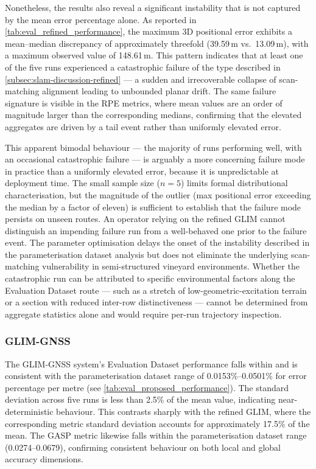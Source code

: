 Nonetheless, the results also reveal a significant instability that is not captured by the mean error percentage alone. As reported in \cref{tab:eval_refined_performance}, the maximum 3D positional error exhibits a mean--median discrepancy of approximately threefold (39.59\,m vs.\ 13.09\,m), with a maximum observed value of 148.61\,m. This pattern indicates that at least one of the five runs experienced a catastrophic failure of the type described in \cref{subsec:slam-discussion-refined} — a sudden and irrecoverable collapse of scan-matching alignment leading to unbounded planar drift. The same failure signature is visible in the RPE metrics, where mean values are an order of magnitude larger than the corresponding medians, confirming that the elevated aggregates are driven by a tail event rather than uniformly elevated error.

This apparent bimodal behaviour — the majority of runs performing well, with an occasional catastrophic failure — is arguably a more concerning failure mode in practice than a uniformly elevated error, because it is unpredictable at deployment time. The small sample size ($n = 5$) limits formal distributional characterisation, but the magnitude of the outlier (max positional error exceeding the median by a factor of eleven) is sufficient to establish that the failure mode persists on unseen routes. An operator relying on the refined GLIM cannot distinguish an impending failure run from a well-behaved one prior to the failure event. The parameter optimisation delays the onset of the instability described in the parameterisation dataset analysis but does not eliminate the underlying scan-matching vulnerability in semi-structured vineyard environments. Whether the catastrophic run can be attributed to specific environmental factors along the Evaluation Dataset route — such as a stretch of low-geometric-excitation terrain or a section with reduced inter-row distinctiveness — cannot be determined from aggregate statistics alone and would require per-run trajectory inspection.

\subsubsection{GLIM-GNSS}

The GLIM-GNSS system's Evaluation Dataset performance falls within and is consistent with the parameterisation dataset range of 0.0153\%--0.0501\% for error percentage per metre (see \cref{tab:eval_proposed_performance}). The standard deviation across five runs is less than 2.5\% of the mean value, indicating near-deterministic behaviour. This contrasts sharply with the refined GLIM, where the corresponding metric standard deviation accounts for approximately 17.5\% of the mean. The GASP metric likewise falls within the parameterisation dataset range (0.0274--0.0679), confirming consistent behaviour on both local and global accuracy dimensions.


